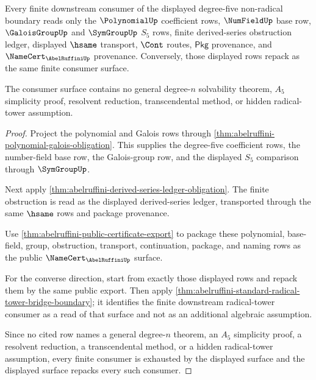 \begin{theorem}\label{thm:abelruffini-finite-consumer-completeness}
Every finite downstream consumer of the displayed degree-five non-radical
boundary reads only the $\PolynomialUp$ coefficient rows, $\NumFieldUp$ base
row, $\GaloisGroupUp$ and $\SymGroupUp$ $S_5$ rows, finite derived-series
obstruction ledger, displayed $\hsame$ transport, $\Cont$ routes,
$\mathsf{Pkg}$ provenance, and $\NameCert_{\AbelRuffiniUp}$ provenance.
Conversely, those displayed rows repack as the same finite consumer surface.

The consumer surface contains no general degree-$n$ solvability theorem,
$A_5$ simplicity proof, resolvent reduction, transcendental method, or hidden
radical-tower assumption.
\end{theorem}
\begin{proof}
Project the polynomial and Galois rows through
\autoref{thm:abelruffini-polynomial-galois-obligation}. This supplies the
degree-five coefficient rows, the number-field base row, the Galois-group row,
and the displayed $S_5$ comparison through $\SymGroupUp$.

Next apply \autoref{thm:abelruffini-derived-series-ledger-obligation}. The
finite obstruction is read as the displayed derived-series ledger, transported
through the same $\hsame$ rows and package provenance.

Use \autoref{thm:abelruffini-public-certificate-export} to package these
polynomial, base-field, group, obstruction, transport, continuation, package,
and naming rows as the public $\NameCert_{\AbelRuffiniUp}$ surface.

For the converse direction, start from exactly those displayed rows and repack
them by the same public export. Then apply
\autoref{thm:abelruffini-standard-radical-tower-bridge-boundary}; it identifies
the finite downstream radical-tower consumer as a read of that surface and not
as an additional algebraic assumption.

Since no cited row names a general degree-$n$ theorem, an $A_5$ simplicity
proof, a resolvent reduction, a transcendental method, or a hidden
radical-tower assumption, every finite consumer is exhausted by the displayed
surface and the displayed surface repacks every such consumer.
\end{proof}


